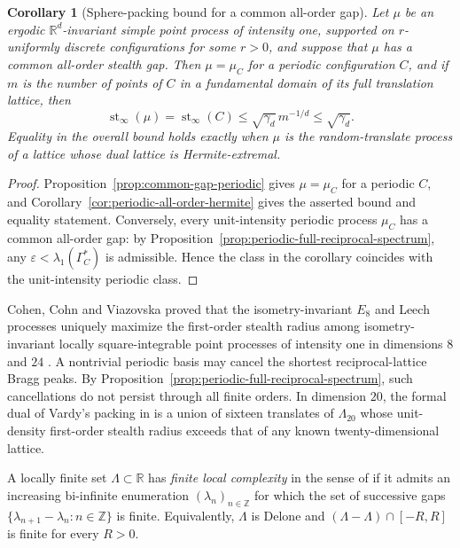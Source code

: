 \documentclass[11pt,reqno,a4paper]{amsart}
\numberwithin{equation}{section}
\theoremstyle{compact}
\newtheorem{corollary}[corollary]{Corollary}
\theoremstyle{definition}
\theoremstyle{definition}
\begin{document}
\begin{corollary}[Sphere-packing bound for a common all-order gap]
\label{cor:common-gap-sphere-packing}
Let $\mu$ be an ergodic $\mathbb R^d$-invariant simple point process of
intensity one, supported on $r$-uniformly discrete configurations for some
$r>0$, and suppose that $\mu$ has a common all-order stealth gap.  Then
$\mu=\mu_C$ for a periodic configuration $C$, and if $m$ is the number of
points of $C$ in a fundamental domain of its full translation lattice, then
\[
  \operatorname{st}_\infty(\mu)
  =\operatorname{st}_\infty(C)
  \leq\sqrt{\gamma_d}\,m^{-1/d}
  \leq\sqrt{\gamma_d}.
\]
Equality in the overall bound holds exactly when $\mu$ is the
random-translate process of a lattice whose dual lattice is Hermite-extremal.
\end{corollary}

\begin{proof}
Proposition~\ref{prop:common-gap-periodic} gives $\mu=\mu_C$ for a periodic
$C$, and Corollary~\ref{cor:periodic-all-order-hermite} gives the asserted
bound and equality statement.  Conversely, every unit-intensity periodic
process $\mu_C$ has a common all-order gap: by
Proposition~\ref{prop:periodic-full-reciprocal-spectrum}, any
$\varepsilon<\lambda_1(\Gamma_C^*)$ is admissible.  Hence the class in the corollary coincides with the unit-intensity periodic
class.
\end{proof}

Cohen, Cohn and Viazovska proved that the isometry-invariant $E_8$ and
Leech processes uniquely maximize the first-order stealth radius among
isometry-invariant locally square-integrable point processes of intensity one
in dimensions $8$ and $24$ \cite[Theorem~1.1]{CCV26}.  A nontrivial periodic
basis may cancel the shortest reciprocal-lattice Bragg peaks.  By
Proposition~\ref{prop:periodic-full-reciprocal-spectrum}, such cancellations do
not persist through all finite orders.  In dimension $20$, the formal dual of
Vardy's packing in \cite[Section~5]{CCV26} is a union of sixteen translates of
$\Lambda_{20}$ whose unit-density first-order stealth radius exceeds that of
any known twenty-dimensional lattice.


A locally finite set $\Lambda\subset\mathbb R$ has \emph{finite local
complexity} in the sense of \cite{KL16} if it admits an increasing
bi-infinite enumeration $(\lambda_n)_{n\in\mathbb Z}$ for which the set of
successive gaps $\{\lambda_{n+1}-\lambda_n:n\in\mathbb Z\}$ is finite.
Equivalently, $\Lambda$ is Delone and
$(\Lambda-\Lambda)\cap[-R,R]$ is finite for every $R>0$.
\end{document}
